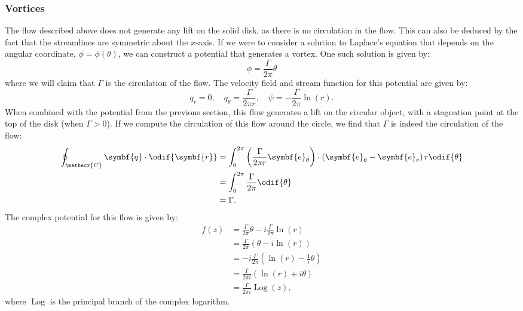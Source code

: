\documentclass{article}
\theoremstyle{definition}
\DeclareMathOperator{\Log}{Log}
\begin{document}
\subsubsection{Vortices}
The flow described above does not generate any lift on the solid disk,
as there is no circulation in the flow. This can also be deduced by the
fact that the streamlines are symmetric about the \(x\)-axis. If we
were to consider a solution to Laplace's equation that depends on the
angular coordinate, \(\phi = \phi\left( \theta \right)\), we can
construct a potential that generates a vortex. One such solution is
given by:
\begin{equation*}
    \phi = \frac{\Gamma}{2\pi} \theta
\end{equation*}
where we will claim that \(\Gamma\) is the circulation of the flow. The
velocity field and stream function for this potential are given by:
\begin{equation*}
    q_r = 0, \quad q_{\theta} = \frac{\Gamma}{2\pi r}, \quad \psi = -\frac{\Gamma}{2\pi} \ln{\left( r \right)}.
\end{equation*}
When combined with the potential from the previous section, this flow
generates a lift on the circular object, with a stagnation point at the
top of the disk (when \(\Gamma > 0\)). If we compute the circulation of
this flow around the circle, we find that \(\Gamma\) is indeed the
circulation of the flow:
\begin{align*}
    \oint_{\mathscr{C}} \symbf{q} \cdot \odif{\symbf{r}} & = \int_{0}^{2\pi} \left( \frac{\Gamma}{2\pi r} \symbf{e}_{\theta} \right) \cdot \left( \symbf{e}_{\theta} - \symbf{e}_r \right) r \odif{\theta} \\
                                                         & = \int_{0}^{2\pi} \frac{\Gamma}{2\pi} \odif{\theta}                                                                                             \\
                                                         & = \Gamma.
\end{align*}
The complex potential for this flow is given by:
\begin{align*}
    f\left( z \right) & = \frac{\Gamma}{2\pi} \theta - i \frac{\Gamma}{2\pi} \ln{\left( r \right)}         \\
                      & = \frac{\Gamma}{2\pi} \left( \theta - i \ln{\left( r \right)} \right)              \\
                      & = -i \frac{\Gamma}{2\pi} \left( \ln{\left( r \right)} - \frac{1}{i} \theta \right) \\
                      & = \frac{\Gamma}{2\pi i} \left( \ln{\left( r \right)} + i \theta \right)            \\
                      & = \frac{\Gamma}{2\pi i} \Log{\left( z \right)},
\end{align*}
where \(\Log\) is the principal branch of the complex logarithm.
\end{document}

